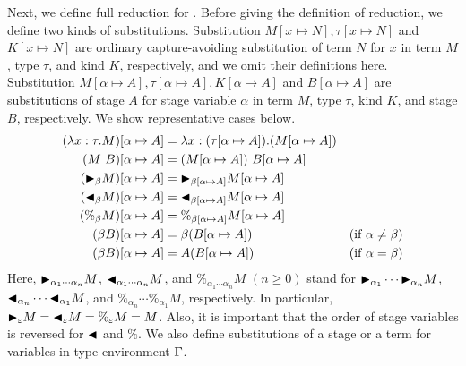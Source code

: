 Next, we define full reduction for \LMD.
Before giving the definition of reduction, we define two kinds of substitutions.
Substitution $M[x\mapsto N], \tau[x \mapsto N]$ and $K[x \mapsto N]$ are
ordinary capture-avoiding substitution of
term $N$ for $x$ in term $M$, type $\tau$, and kind $K$, respectively,
and we omit their definitions here.
Substitution $M[\alpha \mapsto A], \tau [\alpha \mapsto A], K[\alpha \mapsto A]$ and $B[\alpha\mapsto A]$ are
substitutions of stage $A$ for stage variable $\alpha$ in term $M$, type $\tau$, kind $K$, and stage $B$, respectively.
We show representative cases below.
%
{%
\begin{align*}
    (\lambda x:\tau.M)[\alpha \mapsto A] & = \lambda x:(\tau[\alpha \mapsto A]).(M[\alpha \mapsto A])                                  \\
    (M\ B)[\alpha \mapsto A]             & = (M[\alpha \mapsto A])\ B[\alpha\mapsto A]                                                 \\
    ({\mathop{\blacktriangleright}}_\beta M)[\alpha \mapsto A]      & = {\mathop{\blacktriangleright}}_{\beta[\alpha \mapsto A]}M[\alpha \mapsto A]                                          \\
    ({\mathop{\blacktriangleleft}}_\beta M)[\alpha \mapsto A]     & = {\mathop{\blacktriangleleft}}_{\beta[\alpha \mapsto A]}M[\alpha \mapsto A]                                         \\
    (\%_\beta M)[\alpha \mapsto A]       & = \%_{\beta[\alpha \mapsto A]}M[\alpha \mapsto A]                                           \\
    (\beta B)[\alpha \mapsto A]          & = \beta (B[\alpha\mapsto A])                               & (\text{if } \alpha \neq \beta) \\
    (\beta B)[\alpha \mapsto A]          & = A (B[\alpha\mapsto A])                                   & (\text{if } \alpha = \beta)
\end{align*}
}
Here, ${\mathop{\blacktriangleright}}_{\alpha_1\cdots\alpha_n} M$,
${\mathop{\blacktriangleleft}}_{\alpha_1\cdots\alpha_n} M$, and $\%_{\alpha_1\cdots\alpha_n} M$
$(n \geq 0)$ stand for ${\mathop{\blacktriangleright}}_{\alpha_1} \cdots {\mathop{\blacktriangleright}}_{\alpha_n} M$,
${\mathop{\blacktriangleleft}}_{\alpha_n}\cdots {\mathop{\blacktriangleleft}}_{\alpha_1} M$, and
$\%_{\alpha_n}\cdots \%_{\alpha_1} M$, respectively.  
In particular,
${\mathop{\blacktriangleright}}_{\varepsilon} M = {\mathop{\blacktriangleleft}}_{\varepsilon} M = \%_{\varepsilon} M = M$.
Also, it is important that
the order of stage variables is reversed for ${\mathop{\blacktriangleleft}}$ and $\%$.
We also define substitutions of a stage or a term for variables in type environment $\Gamma$.


